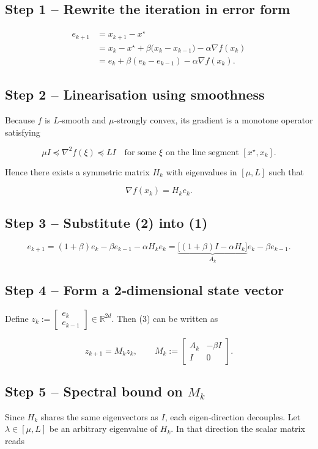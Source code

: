 \documentclass{article}
\begin{document}
\subsection*{Step 1 – Rewrite the iteration in error form}
\[
\begin{aligned}
e_{k+1}
&=x_{k+1}-x^\star \\
&=x_k-x^\star +\beta\bigl(x_k-x_{k-1}\bigr)-\alpha\nabla f(x_k)\\
&=e_k+\beta(e_k-e_{k-1})-\alpha\nabla f(x_k).
\end{aligned}
\tag{1}
\]

\subsection*{Step 2 – Linearisation using smoothness}
Because $f$ is $L$‑smooth and $\mu$‑strongly convex,
its gradient is a monotone operator satisfying  

\[
\mu I \preceq \nabla^{2}f(\xi) \preceq L I
\quad\text{for some }\xi\text{ on the line segment }[x^\star,x_k].
\]

Hence there exists a symmetric matrix $H_k$ with eigenvalues in $[\mu,L]$ such that  

\[
\nabla f(x_k)=H_k e_k .
\tag{2}
\]

\subsection*{Step 3 – Substitute (2) into (1)}
\[
e_{k+1}= (1+\beta) e_k - \beta e_{k-1} -\alpha H_k e_k
      = \underbrace{\bigl[(1+\beta)I-\alpha H_k\bigr]}_{A_k} e_k
        -\beta e_{k-1}.
\tag{3}
\]

\subsection*{Step 4 – Form a 2‑dimensional state vector}
Define $z_k:=\begin{bmatrix}e_k\\ e_{k-1}\end{bmatrix}\in\mathbb{R}^{2d}$.
Then (3) can be written as  

\[
z_{k+1}=M_k z_k,\qquad 
M_k:=\begin{bmatrix}
A_k & -\beta I\\
I   & 0
\end{bmatrix}.
\tag{4}
\]

\subsection*{Step 5 – Spectral bound on $M_k$}
Since $H_k$ shares the same eigenvectors as $I$, each eigen‑direction
decouples.  Let $\lambda\in[\mu,L]$ be an arbitrary eigenvalue of $H_k$.
In that direction the scalar matrix reads  
\end{document}
